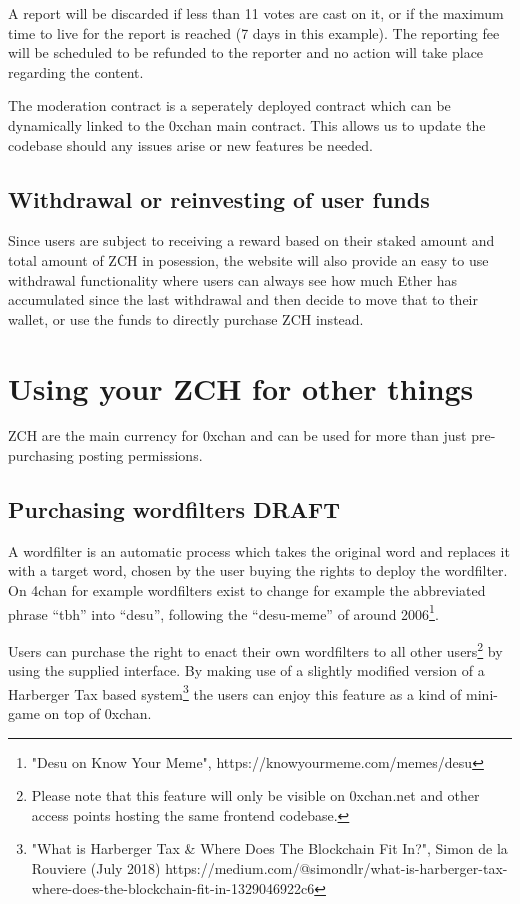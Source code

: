 \documentclass[a4paper]{article}
\newcommand{\projectname}{0xchan}
\begin{document}
A report will be discarded if less than 11 votes are cast on it, or if the maximum time to live for the report is reached (7 days in this example). The reporting fee will be scheduled to be refunded to the reporter and no action will take place regarding the content.

The moderation contract is a seperately deployed contract which can be dynamically linked to the \projectname{} main contract. This allows us to update the codebase should any issues arise or new features be needed.

\subsection{Withdrawal or reinvesting of user funds}
Since users are subject to receiving a reward based on their staked amount and total amount of ZCH in posession, the website will also provide an easy to use withdrawal functionality where users can always see how much Ether has accumulated since the last withdrawal and then decide to move that to their wallet, or use the funds to directly purchase ZCH instead.

\section{Using your ZCH for other things}
ZCH are the main currency for \projectname{} and can be used for more than just pre-purchasing posting permissions.

\subsection{Purchasing wordfilters DRAFT}
A wordfilter is an automatic process which takes the original word and replaces it with a target word, chosen by the user buying the rights to deploy the wordfilter. On 4chan for example wordfilters exist to change for example the abbreviated phrase ``tbh'' into ``desu'', following the ``desu-meme'' of around 2006\footnote{"Desu on Know Your Meme", https://knowyourmeme.com/memes/desu}.

Users can purchase the right to enact their own wordfilters to all other users\footnote{Please note that this feature will only be visible on 0xchan.net and other access points hosting the same frontend codebase.} by using the supplied interface. By making use of a slightly modified version of a Harberger Tax based system\footnote{"What is Harberger Tax \& Where Does The Blockchain Fit In?", Simon de la Rouviere (July 2018) https://medium.com/@simondlr/what-is-harberger-tax-where-does-the-blockchain-fit-in-1329046922c6} the users can enjoy this feature as a kind of mini-game on top of \projectname{}.
\end{document}
